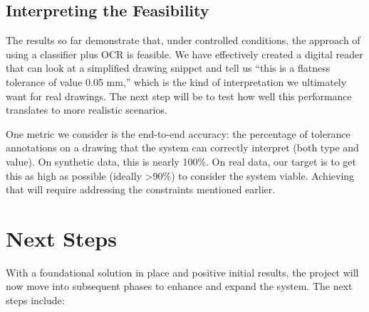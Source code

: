 \documentclass[11pt,a4paper]{article}
\begin{document}
\subsection*{Interpreting the Feasibility}
The results so far demonstrate that, under controlled conditions, the approach of using a classifier plus OCR is feasible. We have effectively created a digital reader that can look at a simplified drawing snippet and tell us “this is a flatness tolerance of value 0.05 mm,” which is the kind of interpretation we ultimately want for real drawings. The next step will be to test how well this performance translates to more realistic scenarios.

One metric we consider is the end-to-end accuracy: the percentage of tolerance annotations on a drawing that the system can correctly interpret (both type and value). On synthetic data, this is nearly 100\%. On real data, our target is to get this as high as possible (ideally \textgreater 90\%) to consider the system viable. Achieving that will require addressing the constraints mentioned earlier.

\section{Next Steps}
With a foundational solution in place and positive initial results, the project will now move into subsequent phases to enhance and expand the system. The next steps include:
\end{document}
